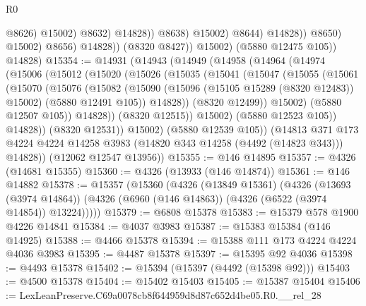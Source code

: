 \begin{lexlean}{R0}
\begin{coremodule}
                                          @8626)
                                        @15002)
                                      @8632)
                                    @14828))
                                @8638)
                              @15002)
                            @8644)
                          @14828))
                      @8650)
                    @15002)
                  @8656)
                @14828))
            (@8320 @8427))
          @15002)
        (@5880 @12475 @105))
      @14828)
@15354 := @14931
    (@14943
      (@14949
        (@14958
          (@14964
            (@14974
              (@15006
                (@15012
                  (@15020
                    (@15026
                      (@15035
                        (@15041
                          (@15047
                            (@15055
                              (@15061
                                (@15070
                                  (@15076
                                    (@15082
                                      (@15090
                                        (@15096 (@15105 @15289 (@8320 @12483)) @15002)
                                        (@5880 @12491 @105))
                                      @14828))
                                  (@8320 @12499))
                                @15002)
                              (@5880 @12507 @105))
                            @14828))
                        (@8320 @12515))
                      @15002)
                    (@5880 @12523 @105))
                  @14828))
              (@8320 @12531))
            @15002)
          (@5880 @12539 @105))
        (@14813
          @371
          @173
          @4224
          @4224
          @14258
          @3983
          (@14820 @343 @14258 (@4492 (@14823 @343)))
          @14828))
      (@12062 @12547 @13956))
@15355 := @146 @14895
@15357 := @4326 (@14681 @15355)
@15360 := @4326 (@13933 (@146 @14874))
@15361 := @146 @14882
@15378 := @15357
    (@15360
      (@4326
        (@13849 @15361)
        (@4326
          (@13693 (@3974 @14864))
          (@4326 (@6960 (@146 @14863)) (@4326 (@6522 (@3974 @14854)) @13224)))))
@15379 := @6808 @15378
@15383 := @15379 @578 @1900 @4226 @14841
@15384 := @4037 @3983
@15387 := @15383 @15384 (@146 @14925)
@15388 := @4466 @15378
@15394 := @15388 @111 @173 @4224 @4224 @4036 @3983
@15395 := @4487 @15378
@15397 := @15395 @92 @4036
@15398 := @4493 @15378
@15402 := @15394 (@15397 (@4492 (@15398 @92)))
@15403 := @4500 @15378
@15404 := @15402 @15403
@15405 := @15387 @15404
@15406 := LexLeanPreserve.C69a0078cb8f644959d8d87c652d4be05.R0.__rel_28

\end{coremodule}
\end{lexlean}

